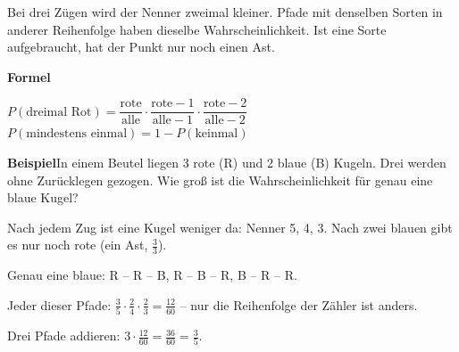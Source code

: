\documentclass[11pt]{article}
\begin{document}
\clearpage\label{s:C}\noindent\colorbox{black!12}{}\hspace{3mm}{\Large\bfseries Drei Züge}\par\smallskip
\noindent Bei drei Zügen wird der Nenner zweimal kleiner. Pfade mit denselben Sorten in anderer Reihenfolge haben dieselbe Wahrscheinlichkeit. Ist eine Sorte aufgebraucht, hat der Punkt nur noch einen Ast.\par\medskip
\noindent\textbf{Formel}\par\nopagebreak\noindent\hspace*{4mm}\begin{minipage}{\dimexpr\linewidth-4mm\relax}$P(\text{dreimal Rot}) = \dfrac{\text{rote}}{\text{alle}} \cdot \dfrac{\text{rote} - 1}{\text{alle} - 1} \cdot \dfrac{\text{rote} - 2}{\text{alle} - 2}$ \qquad $P(\text{mindestens einmal}) = 1 - P(\text{keinmal})$\end{minipage}\par\medskip
\noindent\textbf{Beispiel}\quad In einem Beutel liegen 3 rote (R) und 2 blaue (B) Kugeln. Drei werden ohne Zurücklegen gezogen. Wie groß ist die Wahrscheinlichkeit für genau eine blaue Kugel?\par\smallskip
\noindent\begin{minipage}[t]{0.6\linewidth}\vspace{0pt}\par\noindent{}Nach jedem Zug ist eine Kugel weniger da: Nenner 5, 4, 3. Nach zwei blauen gibt es nur noch rote (ein Ast, $\frac{3}{3}$).\par\smallskip\par\noindent{}Genau eine blaue: R – R – B, R – B – R, B – R – R.\par\smallskip\par\noindent{}Jeder dieser Pfade: $\frac{3}{5} \cdot \frac{2}{4} \cdot \frac{2}{3} = \frac{12}{60}$ – nur die Reihenfolge der Zähler ist anders.\par\smallskip\par\noindent{}Drei Pfade addieren: $3 \cdot \frac{12}{60} = \frac{36}{60} = \frac{3}{5}$.\par\smallskip\end{minipage}\hfill
\end{document}
